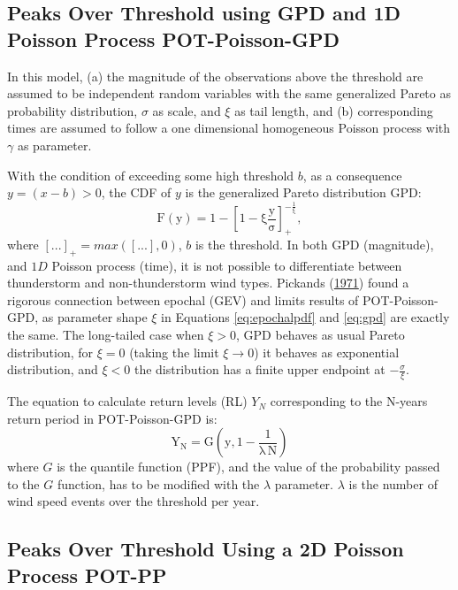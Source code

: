 \documentclass[12pt,twoside]{reedthesis}
\begin{document}
\hypertarget{pot-poisson-gpd}{%
\subsection{Peaks Over Threshold using GPD and 1D Poisson Process POT-Poisson-GPD}\label{pot-poisson-gpd}}

In this model, (a) the magnitude of the observations above the threshold are assumed to be independent random variables with the same generalized Pareto as probability distribution, \(\sigma\) as scale, and \(\xi\) as tail length, and (b) corresponding times are assumed to follow a one dimensional homogeneous Poisson process with \(\gamma\) as parameter.

With the condition of exceeding some high threshold \(b\), as a consequence \(y = (x-b) > 0\), the CDF of \(y\) is the generalized Pareto distribution GPD:
\begin{equation}
\mathrm{
        F(y) = 1 - \left[1-\xi\frac{y}{\sigma}\right]^{-\frac{1}{\xi}}_+,
       }
  \label{eq:gpd}
\end{equation}
where \([...]_+ = max([...],0)\), \(b\) is the threshold. In both GPD (magnitude), and \(1D\) Poisson process (time), it is not possible to differentiate between thunderstorm and non-thunderstorm wind types. Pickands (\protect\hyperlink{ref-Pickands1971}{1971}) found a rigorous connection between epochal (GEV) and limits results of POT-Poisson-GPD, as parameter shape \(\xi\) in Equations \eqref{eq:epochalpdf} and \eqref{eq:gpd} are exactly the same. The long-tailed case when \(\xi>0\), GPD behaves as usual Pareto distribution, for \(\xi = 0\) (taking the limit \(\xi\rightarrow0\)) it behaves as exponential distribution, and \(\xi<0\) the distribution has a finite upper endpoint at \(-\frac{\sigma}{\xi}\).

The equation to calculate return levels (RL) \(Y_N\) corresponding to the N-years return period in POT-Poisson-GPD is:
\begin{equation}
\mathrm{
        Y_N =G\left(y, 1-\frac{1}{\lambda\,N}\right)
       }
  \label{eq:yngpd}
\end{equation}
where \(G\) is the quantile function (PPF), and the value of the probability passed to the \(G\) function, has to be modified with the \(\lambda\) parameter. \(\lambda\) is the number of wind speed events over the threshold per year.

\hypertarget{method-pot-pp}{%
\subsection{Peaks Over Threshold Using a 2D Poisson Process POT-PP}\label{method-pot-pp}}
\end{document}
